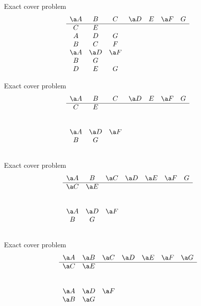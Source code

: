 \documentclass[xcolor=svgnames]{beamer}
\begin{document}
%
\begin{frame}{Exact cover problem} 
  $$
  \begin{array}{ccccccc}
    \a A & B & C & \a D & E & \a F & G\\
    \hline
    C & E &&&&&\\
    A & D & G &&&&\\
    B & C & F &&&&\\
    \a A & \a D & \a F &&&&\\
    B & G &&&&&\\
    D & E & G &&&&
  \end{array}
  $$
\end{frame}

%
\begin{frame}{Exact cover problem} 
  $$
  \begin{array}{ccccccc}
    \a A & B & C & \a D & E & \a F & G\\
    \hline
    C & E &&&&&\\
    &&&&&&\\
    &&&&&&\\
    \a A & \a D & \a F &&&&\\
    B & G &&&&&\\
    &&&&&&
  \end{array}
  $$
\end{frame}

%
\begin{frame}{Exact cover problem} 
  $$
  \begin{array}{ccccccc}
    \a A & B & \a C & \a D & \a E & \a F & G\\
    \hline
    \a C & \a E &&&&&\\
    &&&&&&\\
    &&&&&&\\
    \a A & \a D & \a F &&&&\\
    B & G &&&&&\\
    &&&&&&
  \end{array}
  $$
\end{frame}

%
\begin{frame}{Exact cover problem} 
  $$
  \begin{array}{ccccccc}
    \a A & \a B & \a C & \a D
    & \a E & \a F & \a G\\
    \hline
    \a C & \a E &&&&&\\
    &&&&&&\\
    &&&&&&\\
    \a A & \a D & \a F &&&&\\
    \a B & \a G &&&&&\\
    &&&&&&
  \end{array}
  $$
\end{frame}
\end{document}
